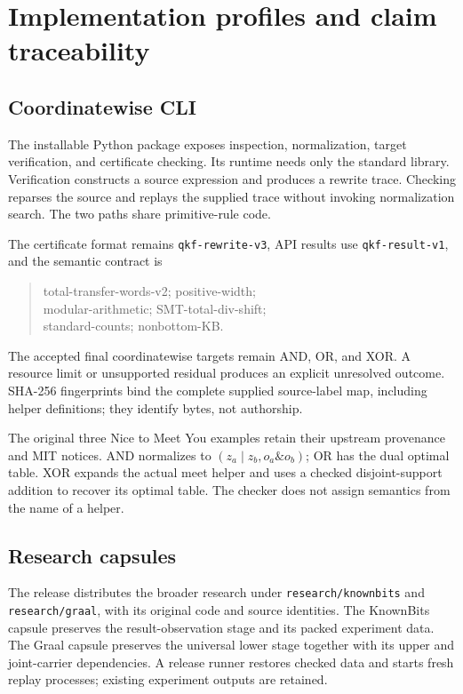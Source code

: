 \section{Implementation profiles and claim traceability}\label{sec:implementation}

\subsection{Coordinatewise CLI}
The installable Python package exposes inspection, normalization, target verification, and certificate checking. Its runtime needs only the standard library. Verification constructs a source expression and produces a rewrite trace. Checking reparses the source and replays the supplied trace without invoking normalization search. The two paths share primitive-rule code.

The certificate format remains \texttt{qkf-rewrite-v3}, API results use \texttt{qkf-result-v1}, and the semantic contract is
\begin{quote}\small\ttfamily\raggedright
total-transfer-words-v2; positive-width;\\
modular-arithmetic; SMT-total-div-shift;\\
standard-counts; nonbottom-KB.
\end{quote}
The accepted final coordinatewise targets remain AND, OR, and XOR. A resource limit or unsupported residual produces an explicit unresolved outcome. SHA-256 fingerprints bind the complete supplied source-label map, including helper definitions; they identify bytes, not authorship.

The original three Nice to Meet You examples retain their upstream provenance and MIT notices. AND normalizes to $(z_a\mathbin{|}z_b,o_a\mathbin{\&}o_b)$; OR has the dual optimal table. XOR expands the actual meet helper and uses a checked disjoint-support addition to recover its optimal table. The checker does not assign semantics from the name of a helper.

\subsection{Research capsules}
The release distributes the broader research under \texttt{research/knownbits} and \texttt{research/graal}, with its original code and source identities. The KnownBits capsule preserves the result-observation stage and its packed experiment data. The Graal capsule preserves the universal lower stage together with its upper and joint-carrier dependencies. A release runner restores checked data and starts fresh replay processes; existing experiment outputs are retained.

